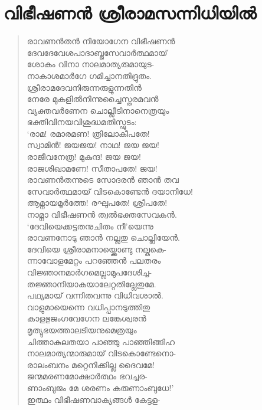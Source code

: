 \section{വിഭീഷണന്‍ ശ്രീരാമസന്നിധിയില്‍}

\begin{verse}
രാവണന്‍തന്‍ നിയോഗേന വിഭീഷണന്‍\\
ദേവദേവേശപാദാബ്ജസേവാര്‍ത്ഥമായ്\\
ശോകം വിനാ നാലമാത്യരുമായുട-\\
നാകാശമാര്‍ഗേ ഗമിച്ചാനതിദ്രുതം.\\
ശ്രീരാമദേവനിരുന്നരുളുന്നതിന്‍\\
നേരേ മുകളില്‍നിന്നുച്ചൈസ്തരമവന്‍\\
വ്യക്തവര്‍ണേന ചൊല്ലീടിനാനെത്രയും\\
ഭക്തിവിനയവിശുദ്ധമതിസ്ഫുടം:\\
‘രാമ! രമാരമണ! ത്രിലോകീപതേ!\\
സ്വാമിന്‍! ജയജയ! നാഥ! ജയ ജയ!\\
രാജീവനേത്ര! മുകുന്ദ! ജയ ജയ!\\
രാജശിഖാമണേ! സീതാപതേ! ജയ!\\
രാവണന്‍തന്നുടെ സോദരന്‍ ഞാന്‍ തവ\\
സേവാര്‍ത്ഥമായ് വിടകൊണ്ടേന്‍ ദയാനിധേ!\\
ആമ്നായമൂര്‍ത്തേ! രഘുപതേ! ശ്രീപതേ!\\
നാമ്നാ വിഭീഷണന്‍ ത്വല്‍ഭക്തസേവകന്‍.\\
‘ദേവിയെക്കട്ടതനുചിതം നീ’യെന്നു\\
രാവണനോടു ഞാന്‍ നല്ലതു ചൊല്ലിയേന്‍.\\
ദേവിയെ ശ്രീരാമനായ്ക്കൊണ്ടു നല്കുകെ-\\
ന്നാവോളമേറ്റം പറഞ്ഞേന്‍ പലതരം\\
വിജ്ഞാനമാര്‍ഗമെല്ലാമുപദേശിച്ച-\\
തജ്ഞാനിയാകയാലേറ്റതില്ലേതുമേ.\\
പഥ്യമായ് വന്നിതവന്നു വിധിവശാല്‍.\\
വാളുമായെന്നെ വധിപ്പാനടുത്തിതു\\
കാളഭുജംഗവേഗേന ലങ്കേശ്വരന്‍\\
മൃത്യുഭയത്താലടിയനുമെത്രയും\\
ചിത്താകുലതയാ പാഞ്ഞു പാഞ്ഞിങ്ങിഹ\\
നാലമാത്യന്മാരുമായ് വിടകൊണ്ടേനൊ-\\
രാലംബനം മറ്റെനിക്കില്ല ദൈവമേ!\\
ജന്മമരണമോക്ഷാര്‍ത്ഥം ഭവച്ചര-\\
ണാംബുജം മേ ശരണം കരുണാംബുധേ!’\\
ഇത്ഥം വിഭീഷണവാക്യങ്ങള്‍ കേട്ടള-\\

\end{verse}
